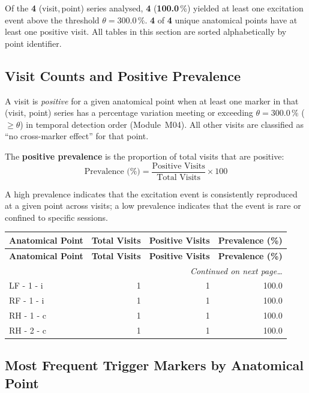 \documentclass[a4paper,11pt]{article}
\begin{document}
\noindent
Of the \textbf{4} (visit,\,point) series analysed,
\textbf{4} (\textbf{100.0}\,\%) yielded at least one
excitation event above the threshold $\theta = 300.0\,\%$.
\textbf{4} of \textbf{4} unique anatomical points
have at least one positive visit.
All tables in this section are sorted alphabetically by point identifier.

\subsection{Visit Counts and Positive Prevalence}

A visit is \emph{positive} for a given anatomical point when at least one marker in that
(visit, point) series has a percentage variation meeting or exceeding
$\theta = 300.0\,\%$ ($\geq \theta$) in temporal detection order (Module~M04).
All other visits are classified as ``no cross-marker effect'' for that point.

The \textbf{positive prevalence} is the proportion of total visits that are positive:
\[
  \text{Prevalence (\%)} = \frac{\text{Positive Visits}}{\text{Total Visits}} \times 100
\]

A high prevalence indicates that the excitation event is consistently reproduced at a given
point across visits; a low prevalence indicates that the event is rare or confined to
specific sessions.

\begin{small}
\begin{longtable}{p{5cm}rrr}
\toprule
\textbf{Anatomical Point} &
\textbf{Total Visits} &
\textbf{Positive Visits} &
\textbf{Prevalence (\%)} \\
\midrule
\endfirsthead
\toprule
\textbf{Anatomical Point} &
\textbf{Total Visits} &
\textbf{Positive Visits} &
\textbf{Prevalence (\%)} \\
\midrule
\endhead
\midrule
\multicolumn{4}{r}{\small\emph{Continued on next page\ldots}} \\
\endfoot
\bottomrule
\endlastfoot
LF - 1 - i & 1 & 1 & 100.0 \\
RF - 1 - i & 1 & 1 & 100.0 \\
RH - 1 - c & 1 & 1 & 100.0 \\
RH - 2 - c & 1 & 1 & 100.0 \\
\end{longtable}
\end{small}

\subsection{Most Frequent Trigger Markers by Anatomical Point}
\end{document}
